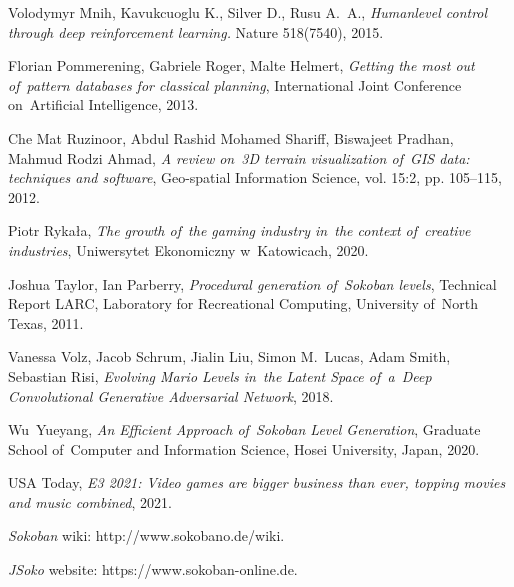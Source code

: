 \documentclass[a4paper,11pt,twoside]{report}
\theoremstyle{definition}
\begin{document}
\begin{thebibliography}{32}
 Volodymyr Mnih, Kavukcuoglu K., Silver D., Rusu A.~A., \emph{Humanlevel control through deep reinforcement learning.} Nature 518(7540), 2015.

 Florian Pommerening, Gabriele Roger, Malte Helmert, \emph{Getting the most out of~pattern databases for classical planning}, International Joint Conference on~Artificial Intelligence, 2013.

 Che Mat Ruzinoor, Abdul Rashid Mohamed Shariff, Biswajeet Pradhan, Mahmud Rodzi Ahmad, \emph{A review on~3D terrain visualization of~GIS data: techniques and software}, Geo-spatial Information Science, vol. 15:2, pp. 105--115, 2012.

 Piotr Rykała, \emph{The growth of~the gaming industry in~the context of~creative industries}, Uniwersytet Ekonomiczny w~Katowicach, 2020.

 Joshua Taylor, Ian Parberry, \emph{Procedural generation of~Sokoban levels}, Technical Report LARC, Laboratory for Recreational Computing, University of~North Texas, 2011.

 Vanessa Volz, Jacob Schrum, Jialin Liu, Simon M.~Lucas, Adam Smith, Sebastian Risi, \emph{Evolving Mario Levels in~the Latent Space of~a~Deep Convolutional Generative Adversarial Network}, 2018.

 Wu~Yueyang, \emph{An Efficient Approach of~Sokoban Level Generation}, Graduate School of~Computer and Information Science, Hosei University, Japan, 2020.

 USA Today, \emph{E3 2021: Video games are bigger business than ever, topping movies and music combined}, 2021.

 \textit{Sokoban} wiki: http://www.sokobano.de/wiki.

 \textit{JSoko} website: https://www.sokoban-online.de.
\end{thebibliography}

\thispagestyle{empty}

%

\listoffigures
\thispagestyle{empty}
\end{document}
